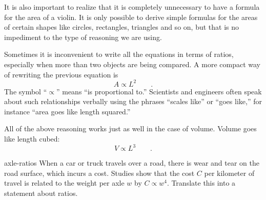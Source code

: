  


\vspace{1.5mm}

It is also important to realize that it is completely
unnecessary to have a formula for the area of a violin. It
is only possible to derive simple formulas for the areas of
certain shapes like circles, rectangles, triangles and so
on, but that is no impediment to the type of reasoning we are using.

Sometimes it is inconvenient to write all the equations in
terms of ratios, especially when more than two objects are
being compared. A more compact way of rewriting the
previous equation is
\begin{equation*}
 A \propto L^2 \qquad .
\end{equation*}
The symbol ``$\propto$'' means ``is proportional to.''
Scientists and engineers often speak about such relationships
verbally using the phrases ``scales like'' or ``goes like,''
for instance ``area goes like length squared.''

All of the above reasoning works just as well in the case of
volume. Volume goes like length cubed:
\begin{equation*}
 V \propto L^3 \qquad .
\end{equation*}

\begin{selfcheck}{axle-ratios}
When a car or truck travels over a road, there is wear and tear on the road surface, which incurs a cost.
Studies show that the cost $C$ per kilometer of travel is related to the weight per axle $w$
by $C \propto w^4$.
Translate this into a statement about ratios.
\end{selfcheck}



